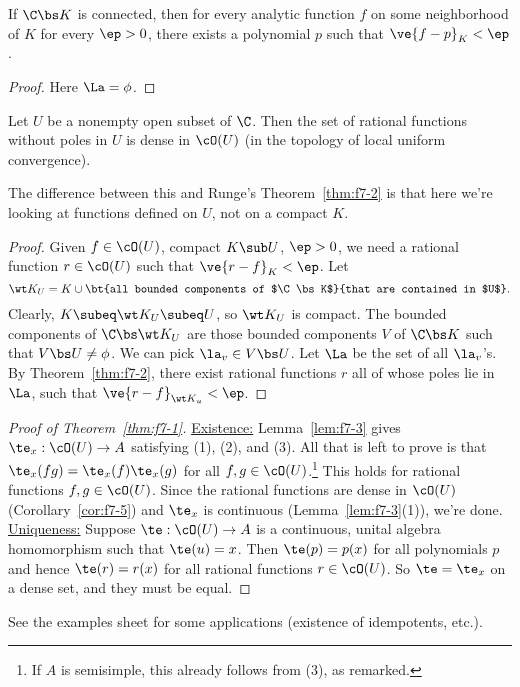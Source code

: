 \begin{cor}
If $\C\bs K$ is connected, then for every analytic function $f$ on some neighborhood of $K$ for every $\ep>0$, there exists a polynomial $p$ such that $\ve{f-p}_K<\ep$.
\end{cor}
\begin{proof}
Here $\La=\phi$.
\end{proof}
\begin{cor}
Let $U$ be a nonempty open subset of $\C$. Then the set of rational functions without poles in $U$ is dense in $\cO(U)$ (in the topology of local uniform convergence).
\end{cor}
The difference between this and Runge's Theorem~\ref{thm:f7-2} is that here we're looking at functions defined on $U$, not on a compact $K$. 
\begin{proof}
Given $f\in \cO(U)$, compact $K\sub U$, $\ep>0$, we need a rational function $r\in \cO(U)$ such that $\ve{r-f}_K<\ep$. Let
\[
\wt K_U=K\cup \bt{all bounded components of $\C\bs K$}{that are contained in $U$}.
\]
%
Clearly, $K\subeq \wt K_U\subeq U$, so $\wt K_U$ is compact. The bounded components of $\C\bs \wt K_U$ are those bounded components $V$ of $\C\bs K$ such that $V\bs U\ne \phi$. We can pick $\la_v\in V\bs U$.
Let $\La$ be the set of all $\la_v$'s. By Theorem~\ref{thm:f7-2}, there exist rational functions $r$ all of whose poles lie in $\La$, such that $\ve{r-f}_{\wt K_u}<\ep$.
\end{proof}
\begin{proof}[Proof of Theorem~\ref{thm:f7-1}]
\ul{Existence:} Lemma~\ref{lem:f7-3} gives $\te_x:\cO(U)\to A$ satisfying (1), (2), and (3). All that is left to prove is that $\te_x(fg)=\te_x(f)\te_x(g)$ for all $f,g\in \cO(U)$.\footnote{If $A$ is semisimple, this already follows from (3), as remarked.} This holds for rational functions $f,g\in \cO(U)$. Since the rational functions are dense in $\cO(U)$ (Corollary~\ref{cor:f7-5}) and $\te_x$ is continuous (Lemma~\ref{lem:f7-3}(1)), we're done.\\

\ul{Uniqueness:} Suppose $\te:\cO(U)\to A$ is a continuous, unital algebra homomorphism such that $\te(u)=x$. Then $\te(p)=p(x)$ for all polynomials $p$ and hence $\te(r)=r(x)$ for all rational functions $r\in \cO(U)$. So $\te=\te_x$ on a dense set, and they must be equal.
\end{proof}
See the examples sheet for some applications (existence of idempotents, etc.).

